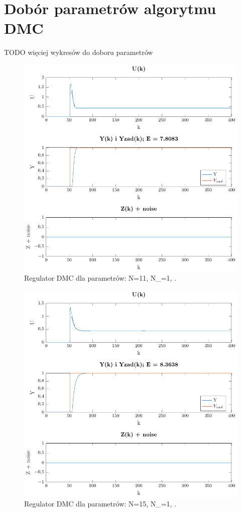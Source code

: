 \documentclass[a4paper,titlepage,11pt,twosides,floatssmall]{mwrep}
\begin{document}
\section{Dobór parametrów algorytmu DMC}

TODO więciej wykresów do doboru parametrów

\begin{figure}[H]
	\centering
	\includegraphics[scale=0.85]{../../Lab2/PDF_rysunki/Z4_DMCParametryN_11_Nu_1_lam_1.pdf}
	\caption{Regulator DMC dla parametrów: N=11, N_{}=1, .}
	\label{dobor_param1}
\end{figure}

\begin{figure}[H]
	\centering
	\includegraphics[scale=0.85]{../../Lab2/PDF_rysunki/Z4_DMCParametryN_15_Nu_1_lam_1.pdf}
	\caption{Regulator DMC dla parametrów: N=15, N_{}=1, .}
	\label{dobor_param2}
\end{figure}
\end{document}
